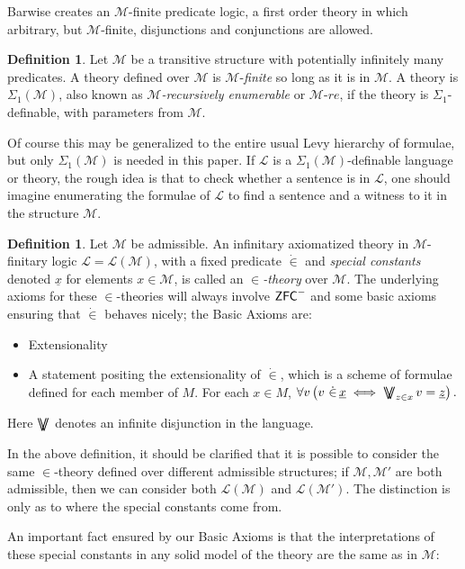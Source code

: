 \documentclass{amsart}
\theoremstyle{definition}
\newtheorem{definition}[theorem]{Definition}
\theoremstyle{remark}
\newcommand{\M}{\mathcal{M}}
\newcommand{\ZFC}{\textup{\ensuremath{\textsf{ZFC}}}}
\DeclareMathOperator*{\bigdoublevee}{\bigvee\mkern-15mu\bigvee}
\begin{document}
Barwise creates an $\M$-finite predicate logic, a first order theory in which arbitrary, but $\M$-finite, disjunctions and conjunctions are allowed.
\begin{definition} Let $\M$ be a transitive structure with potentially infinitely many predicates. A theory defined over $\M$ is $\M$-\emph{finite} so long as it is in $\M$. A theory is $\Sigma_1(\M)$, also known as \emph{$\M$-recursively enumerable} or $\M$-$re$, if the theory is $\Sigma_1$-definable, with parameters from $\M$. \end{definition}
Of course this may be generalized to the entire usual Levy hierarchy of formulae, but only $\Sigma_1(\M)$ is needed in this paper. If $\mathcal L$ is a $\Sigma_1(\M)$-definable language or theory, the rough idea is that to check whether a sentence is in $\mathcal L$, one should imagine enumerating the formulae of $\mathcal L$ to find a sentence and a witness to it in the structure $\M$.

\begin{definition} \label{def:InTheoriesAndBasicAxioms} Let $\M$ be admissible. An infinitary axiomatized theory in $\M$-finitary logic $\mathcal L=\mathcal L(\M)$, with a fixed predicate $\dot \in$ and \emph{special constants} denoted $\underline x$ for elements $x \in \M$, is called an \textit{$\in$-theory} over $\M$. The underlying axioms for these $\in$-theories will always involve $\ZFC^-$ and some basic axioms ensuring that $\dot \in$ behaves nicely; 
the \textsf{Basic Axioms} are: \begin{itemize}
	\item \textsf{Extensionality}
	\item A statement positing the extensionality of $\dot \in$, which is a scheme of formulae defined for each member of $M$. For each $x \in M$,
	$\forall v \left( v \ \dot \in\, \underline x \iff \bigdoublevee_{z \in x} v= \underline z \right).$
\end{itemize} Here $\bigdoublevee$ denotes an infinite disjunction in the language.\end{definition}

In the above definition, it should be clarified that it is possible to consider the same $\in$-theory defined over different admissible structures; if $\M, \M'$ are both admissible, then we can consider both $\mathcal L(\M)$ and $\mathcal L(\M')$. The distinction is only as to where the special constants come from. 

An important fact ensured by our \textsf{Basic Axioms} is that the interpretations of these special constants in any solid model of the theory are the same as in $\M$:
\end{document}
